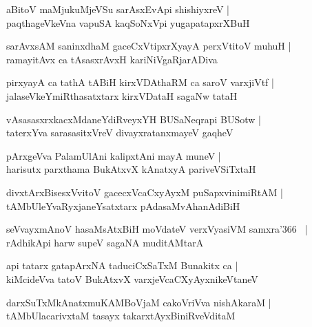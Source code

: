 \documentclass[twoside,12pt,openright]{book}
\newcounter{shloka}[chapter]
\begin{document}
\begin{shloka}%
aBitoV maMjukuMjeVSu sarAsxEvApi shishiyxreV |\\
paqthageVkeVna vapuSA kaqSoNxVpi yugapatapxrXBuH 
\end{shloka}

\begin{shloka}%
sarAvxsAM saninxdhaM gaceCxVtipxrXyayA perxVtitoV muhuH |\\
ramayitAvx ca tAsasxrAvxH kariNiVgaRjarADiva
\end{shloka}

\begin{shloka}%
pirxyayA ca tathA tABiH kirxVDAthaRM ca saroV varxjiVtf |\\
jalaseVkeYmiRthasatxtarx kirxVDataH sagaNw tataH
\end{shloka}

\begin{shloka}%
vAsasasxrxkacxMdaneYdiRveyxYH BUSaNeqrapi BUSotw |\\
taterxYva sarasasitxVreV divayxratanxmayeV gaqheV
\end{shloka}

\begin{shloka}%
pArxgeVva PalamUlAni kalipxtAni mayA muneV |\\
harisutx parxthama BukAtxvX kAnatxyA pariveVSiTxtaH 
\end{shloka}

\begin{shloka}%
divxtArxBisesxVvitoV gacecxVcaCxyAyxM puSapxvinimiRtAM |\\
tAMbUleYvaRyxjaneYsatxtarx pAdasaMvAhanAdiBiH 
\end{shloka}

\begin{shloka}%
seVvayxmAnoV hasaMsAtxBiH moVdateV verxVyasiVM samxra\char'366 ~|\\
rAdhikApi harw supeV sagaNA muditAMtarA 
\end{shloka}

\begin{shloka}%
api tatarx gatapArxNA taduciCxSaTxM Bunakitx ca |\\
kiMcideVva tatoV BukAtxvX varxjeVcaCXyAyxnikeVtaneV 
\end{shloka}

\begin{shloka}%
darxSuTxMkAnatxmuKAMBoVjaM cakoVriVva nishAkaraM |\\
tAMbUlacarivxtaM tasayx takarxtAyxBiniRveVditaM 
\end{shloka}
\end{document}
